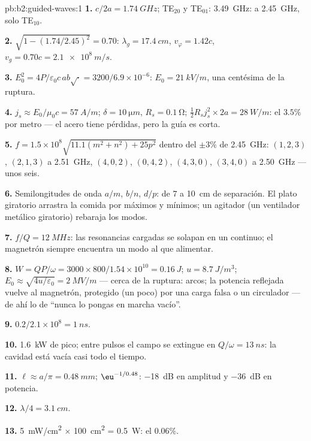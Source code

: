 \begin{solution}{pb:b2:guided-waves:1}
\textbf{1.} $c/2a = \qty{1.74}{GHz}$; TE$_{20}$ y TE$_{01}$: \qty{3.49}{GHz}: a
\qty{2.45}{GHz}, solo TE$_{10}$.

\textbf{2.} $\sqrt{1 - (1.74/2.45)^2} = 0.70$: $\lambda_g = \qty{17.4}{cm}$, $v_\varphi = 1.42c$,
$v_g = 0.70c = \qty{2.1e8}{m/s}$.

\textbf{3.} $E_0^2 = 4P/\varepsilon_0c\,ab\sqrt{\cdot} = 3200/6.9 \times 10^{-6}$: $E_0 = \qty{21}{kV/m}$,
una centésima de la ruptura.

\textbf{4.} $j_s \approx E_0/\mu_0c = \qty{57}{A/m}$; $\delta = \qty{10}{\micro m}$, $R_s = \qty{0.1}{\ohm}$;
$\tfrac12R_sj_s^2 \times 2a = \qty{28}{W/m}$: el $3.5\%$ por metro --- el acero tiene pérdidas,
pero la guía es corta.

\textbf{5.} $f = 1.5 \times 10^8\sqrt{11.1(m^2 + n^2) + 25p^2}$ dentro del $\pm3\%$ de
\qty{2.45}{GHz}: $(1, 2, 3)$, $(2, 1, 3)$ a \qty{2.51}{GHz}, $(4, 0, 2)$, $(0, 4, 2)$,
$(4, 3, 0)$, $(3, 4, 0)$ a \qty{2.50}{GHz} --- unos seis.

\textbf{6.} Semilongitudes de onda $a/m$, $b/n$, $d/p$: de $7$ a \qty{10}{cm} de separación. El
plato giratorio arrastra la comida por máximos y mínimos; un agitador (un
ventilador metálico giratorio) rebaraja los modos.

\textbf{7.} $f/Q = \qty{12}{MHz}$: las resonancias cargadas se solapan en un
continuo; el magnetrón siempre encuentra un modo al que alimentar.

\textbf{8.} $W = QP/\omega = 3000 \times 800/1.54 \times 10^{10} = \qty{0.16}{J}$; $u = \qty{8.7}{J/m^3}$;
$E_0 \approx \sqrt{4u/\varepsilon_0} = \qty{2}{MV/m}$ --- cerca de la ruptura: arcos; la potencia
reflejada vuelve al magnetrón, protegido (un poco) por una carga
falsa o un circulador --- de ahí lo de ``nunca lo pongas en marcha vacío''.

\textbf{9.} $0.2/2.1 \times 10^8 = \qty{1}{ns}$.

\textbf{10.} \qty{1.6}{kW} de pico; entre pulsos el campo se extingue en
$Q/\omega = \qty{13}{ns}$: la cavidad está vacía casi todo el tiempo.

\textbf{11.} $\ell \approx a/\pi = \qty{0.48}{mm}$; $\eu^{-1/0.48}$: \qty{-18}{dB} en amplitud
y \qty{-36}{dB} en potencia.

\textbf{12.} $\lambda/4 = \qty{3.1}{cm}$.

\textbf{13.} \qty{5}{mW/cm^2} $\times$ \qty{100}{cm^2} = \qty{0.5}{W}: el $0.06\%$.


\end{solution}
